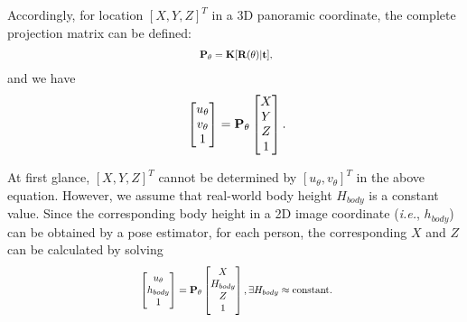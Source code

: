 \documentclass{article}
\newcommand{\ie}{{\it i.e.}}
\begin{document}
Accordingly, for location $[X, Y, Z]^{T}$ in a 3D panoramic coordinate, the complete projection matrix can be defined:
\begin{equation}
\label{eq:tran}
\centering
\scalebox{0.8}{
\begin{math}
\begin{split}
\mathbf{P}_{\theta} = \mathbf{K}[\mathbf{R}(\theta)|\mathbf{t}],\\
\end{split}
\end{math}}
\end{equation}
and we have 
\begin{equation}
\label{eq:tran}
\centering
\scalebox{1}{
\begin{math}
\begin{split}
\begin{bmatrix} 
u_{\theta}\\ 
v_{\theta}\\ 
1
\end{bmatrix}
 = \mathbf{P}_{\theta}
\begin{bmatrix}
X\\ 
Y\\ 
Z\\ 
1
\end{bmatrix}.\\
\end{split}
\end{math}}
\end{equation}

At first glance, $[X, Y, Z]^{T}$ cannot be determined by $[u_{\theta},
v_{\theta}]^{T}$ in the above equation. However, we assume that real-world body height $H_{body}$ is a constant value. Since the corresponding body height in a 2D image coordinate (\ie, $h_{body}$) can be obtained by a pose estimator, for each person, the corresponding $X$ and $Z$ can be calculated by solving
\begin{equation}
\label{eq:loc}
\centering
\scalebox{0.8}{
\begin{math}
\begin{split}
\begin{bmatrix}
u_{\theta}\\ 
h_{body}\\ 
1
\end{bmatrix}= 
\mathbf{P}_{\theta}
\begin{bmatrix}
X\\ 
H_{body}\\ 
Z\\ 
1
\end{bmatrix}, \exists H_{body} \approx \text{constant}.\\
\end{split}
\end{math}}
\end{equation}
\end{document}
